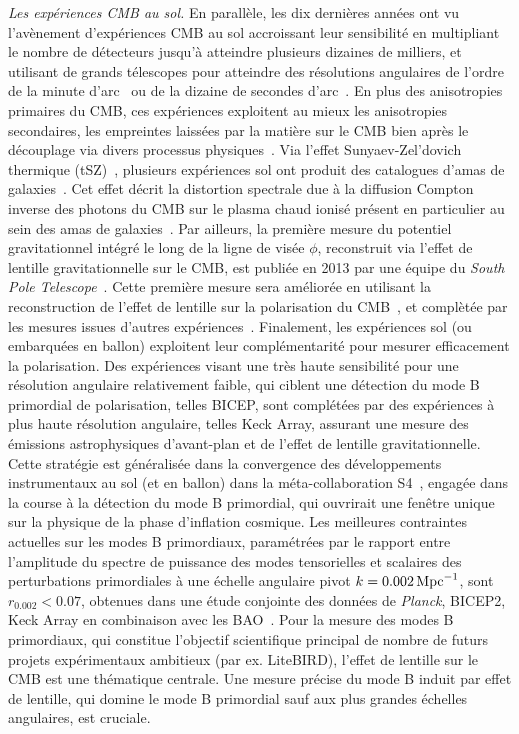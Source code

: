 \emph{Les expériences CMB au sol.} En parallèle, les dix dernières
années ont vu l'avènement d'expériences CMB au sol accroissant leur
sensibilité en multipliant le nombre de détecteurs jusqu'à atteindre plusieurs dizaines de
milliers, et utilisant de grands télescopes pour atteindre des
résolutions angulaires de l'ordre de la minute d'arc~ ou de la dizaine de secondes
d'arc~. En plus des anisotropies primaires du CMB,
ces expériences exploitent au mieux les anisotropies secondaires, les
empreintes laissées par la matière sur le CMB bien après le découplage
via divers processus physiques~. Via l'effet
Sunyaev-Zel'dovich thermique (tSZ)~, plusieurs
expériences sol ont produit des catalogues d'amas de
galaxies~. Cet effet décrit la distortion
spectrale due à la diffusion Compton inverse des photons du CMB sur le
plasma chaud ionisé présent en particulier au sein des amas de
galaxies~. Par ailleurs, la première mesure du
potentiel gravitationnel intégré le long de la ligne de visée $\phi$,
reconstruit via l'effet de lentille gravitationnelle sur le CMB, est
publiée en 2013 par une équipe du \emph{South Pole
Telescope}~. Cette première mesure sera améliorée en
utilisant la reconstruction de l'effet de lentille sur la polarisation
du CMB~, et complètée par les mesures issues d'autres
expériences~. Finalement, les expériences
sol (ou embarquées en ballon) exploitent leur complémentarité pour
mesurer efficacement la polarisation. Des expériences visant une très
haute sensibilité pour une résolution angulaire relativement faible,
qui ciblent une détection du mode B primordial de polarisation, telles
BICEP, sont complétées par des expériences à plus haute résolution
angulaire, telles Keck Array, assurant une mesure des émissions
astrophysiques d'avant-plan et de l'effet de lentille
gravitationnelle. Cette stratégie est généralisée dans la convergence
des développements instrumentaux au sol (et en ballon) dans la
méta-collaboration S4~, engagée dans la course à la
détection du mode B primordial, qui ouvrirait une fenêtre unique sur
la physique de la phase d'inflation cosmique. Les meilleures
contraintes actuelles sur les modes B primordiaux, paramétrées par le
rapport entre l'amplitude du spectre de puissance des modes
tensorielles et scalaires des perturbations primordiales à une échelle
angulaire pivot $k = 0.002\,\rm{Mpc}^{-1}$, sont $r_{0.002} < 0.07$,
obtenues dans une étude conjointe des données de \emph{Planck},
BICEP2, Keck Array en combinaison avec les
BAO~. Pour la mesure des modes B primordiaux,
qui constitue l'objectif scientifique principal de nombre de futurs projets
expérimentaux ambitieux (par ex. LiteBIRD), l'effet de lentille sur le
CMB est une thématique centrale. Une mesure précise du mode B induit
par effet de lentille, qui domine le mode B primordial sauf aux plus
grandes échelles angulaires, est cruciale.\\


